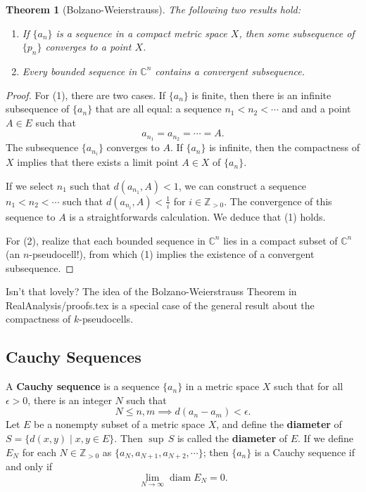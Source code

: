 \documentclass[11pt]{article}
\newtheorem{theorem}{Theorem}
\begin{document}
\begin{theorem}[Bolzano-Weierstrauss]
	The following two results hold:
	\begin{enumerate}
		\item If $\{ a_{n} \}$ is a sequence in a compact metric space $X$, then some subsequence of $\{ p_{n} \}$ converges to a point $X$.
		\item Every bounded sequence in $\mathbb{C}^{n}$ contains a convergent subsequence.
	\end{enumerate}
\end{theorem}
\begin{adjustwidth}{0.5cm}{}
	\begin{proof}
		For (1), there are two cases. If $\{ a_{n} \}$ is finite, then there is an infinite subsequence of $\{ a_{n} \}$ that are all equal: a sequence $n_{1} < n_{2} < \cdots$ and and a point $A \in E$ such that
		\[
			a_{n_{1}} = a_{n_{2}} = \cdots = A.
		\]
		The subsequence $\{ a_{n_{i}} \}$ converges to $A$. If $\{ a_{n} \}$ is infinite, then the compactness of $X$ implies that there exists a limit point $A \in X$ of $\{ a_{n} \}$. 

		If we select $n_{1}$ such that $d(a_{n_{1}}, A) < 1$, we can construct a sequence $n_{1} < n_{2} < \cdots$ such that $d(a_{n_{i}}, A) < \tfrac{1}{i}$ for $i \in \mathbb{Z}_{> 0}$. The convergence of this sequence to $A$ is a straightforwards calculation. We deduce that (1) holds.
		
		For (2), realize that each bounded sequence in $\mathbb{C}^{n}$ lies in a compact subset of $\mathbb{C}^{n}$ (an $n$-pseudocell!), from which (1) implies the existence of a convergent subsequence.
	\end{proof}
\end{adjustwidth}

Isn't that lovely? The idea of the Bolzano-Weierstrauss Theorem in RealAnalysis/proofs.tex is a special case of the general result about the compactness of $k$-pseudocells.


\subsection{Cauchy Sequences}

A \textbf{Cauchy sequence} is a sequence $\{ a_{n} \}$ in a metric space $X$ such that for all $\epsilon > 0$, there is an integer $N$ such that
\[
	N \le n, m \implies d(a_{n} - a_{m}) < \epsilon.
\]
Let $E$ be a nonempty subset of a metric space $X$, and define the \textbf{diameter} of$S = \{ d(x, y) \mid x, y \in E \}$. Then $\sup\,  S$ is called the \textbf{diameter} of $E$. If we define $E_{N}$ for each $N \in \mathbb{Z}_{> 0}$ as $\{ a_{N}, a_{N + 1}, a_{N + 2}, \cdots \}$; then $\{ a_{n} \}$ is a Cauchy sequence if and only if
\[
	\lim\limits_{N \to \infty} \operatorname{diam} E_{N} = 0.
\]
\end{document}
